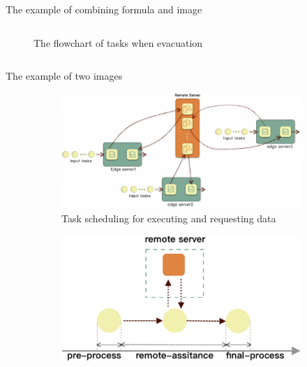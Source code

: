 \documentclass{../../../Cls/SDU/Beamer/Beamer}
\begin{document}
\begin{frame}{The example of combining formula and image}
\begin{columns}[T]
\begin{column}{.40\textwidth}
\begin{figure}[thpb]
{                }
                \caption{The flowchart of tasks when evacuation} %
                \label{fig:tasks} %
            \end{figure}
        \end{column}%
    \end{columns}
\end{frame}

\begin{frame}{The example of two images} %
    \begin{figure}[htb] %
        \label{fig:example} %
        \begin{subfigure}{.45\textwidth} %
            \centering %
            \includegraphics[width=\textwidth]{Images/scheduling.jpg} %
            \caption{Task scheduling for executing and requesting data} %
            \label{fig:scheduling} %
        \end{subfigure}
        \hfill %
        \begin{subfigure}{.45\textwidth} %
            \centering %
            \includegraphics[width=\textwidth]{Images/processing.jpg} %

\end{subfigure}
\end{figure}
\end{frame}
\end{document}
